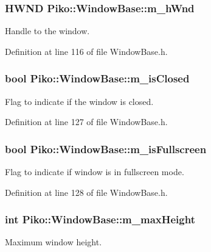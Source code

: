 \hypertarget{class_piko_1_1_window_base_acc26556bb11c8c47a0499aad685bc69e}{
\subsubsection[{m\-\_\-h\-Wnd}]{\setlength{\rightskip}{0pt plus 5cm}H\-W\-N\-D Piko\-::\-Window\-Base\-::m\-\_\-h\-Wnd\hspace{0.3cm}{\ttfamily [private]}}}\label{d5/d35/class_piko_1_1_window_base_acc26556bb11c8c47a0499aad685bc69e}
Handle to the window. 

Definition at line 116 of file Window\-Base.\-h.

\hypertarget{class_piko_1_1_window_base_a0739592738b6a4e46206d3a2bf1cf892}{
\subsubsection[{m\-\_\-is\-Closed}]{\setlength{\rightskip}{0pt plus 5cm}bool Piko\-::\-Window\-Base\-::m\-\_\-is\-Closed\hspace{0.3cm}{\ttfamily [private]}}}\label{d5/d35/class_piko_1_1_window_base_a0739592738b6a4e46206d3a2bf1cf892}
Flag to indicate if the window is closed. 

Definition at line 127 of file Window\-Base.\-h.

\hypertarget{class_piko_1_1_window_base_aa0fcf89b789f911a37d526cd3d45a05b}{
\subsubsection[{m\-\_\-is\-Fullscreen}]{\setlength{\rightskip}{0pt plus 5cm}bool Piko\-::\-Window\-Base\-::m\-\_\-is\-Fullscreen\hspace{0.3cm}{\ttfamily [private]}}}\label{d5/d35/class_piko_1_1_window_base_aa0fcf89b789f911a37d526cd3d45a05b}
Flag to indicate if window is in fullscreen mode. 

Definition at line 128 of file Window\-Base.\-h.

\hypertarget{class_piko_1_1_window_base_ad900258cbbba286731019361cc68c40a}{
\subsubsection[{m\-\_\-max\-Height}]{\setlength{\rightskip}{0pt plus 5cm}int Piko\-::\-Window\-Base\-::m\-\_\-max\-Height\hspace{0.3cm}{\ttfamily [private]}}}\label{d5/d35/class_piko_1_1_window_base_ad900258cbbba286731019361cc68c40a}
Maximum window height. 


